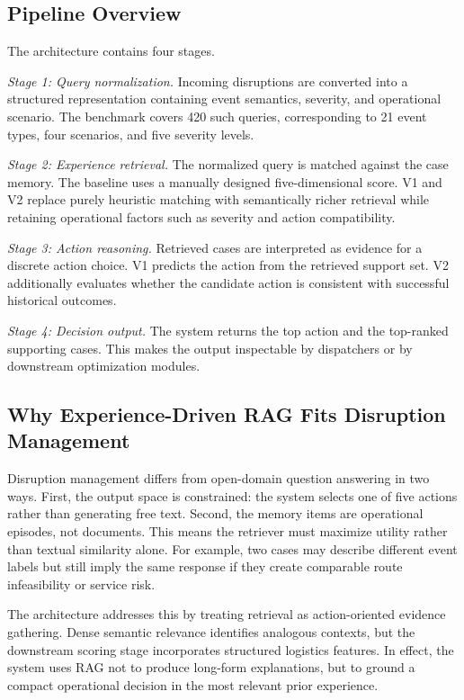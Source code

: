 \documentclass[conference]{IEEEtran}
\begin{document}
\subsection{Pipeline Overview}

The architecture contains four stages.

\textit{Stage 1: Query normalization.} Incoming disruptions are converted into a structured representation containing event semantics, severity, and operational scenario. The benchmark covers 420 such queries, corresponding to 21 event types, four scenarios, and five severity levels.

\textit{Stage 2: Experience retrieval.} The normalized query is matched against the case memory. The baseline uses a manually designed five-dimensional score. V1 and V2 replace purely heuristic matching with semantically richer retrieval while retaining operational factors such as severity and action compatibility.

\textit{Stage 3: Action reasoning.} Retrieved cases are interpreted as evidence for a discrete action choice. V1 predicts the action from the retrieved support set. V2 additionally evaluates whether the candidate action is consistent with successful historical outcomes.

\textit{Stage 4: Decision output.} The system returns the top action and the top-ranked supporting cases. This makes the output inspectable by dispatchers or by downstream optimization modules.

\subsection{Why Experience-Driven RAG Fits Disruption Management}

Disruption management differs from open-domain question answering in two ways. First, the output space is constrained: the system selects one of five actions rather than generating free text. Second, the memory items are operational episodes, not documents. This means the retriever must maximize utility rather than textual similarity alone. For example, two cases may describe different event labels but still imply the same response if they create comparable route infeasibility or service risk.

The architecture addresses this by treating retrieval as action-oriented evidence gathering. Dense semantic relevance identifies analogous contexts, but the downstream scoring stage incorporates structured logistics features. In effect, the system uses RAG not to produce long-form explanations, but to ground a compact operational decision in the most relevant prior experience.
\end{document}
